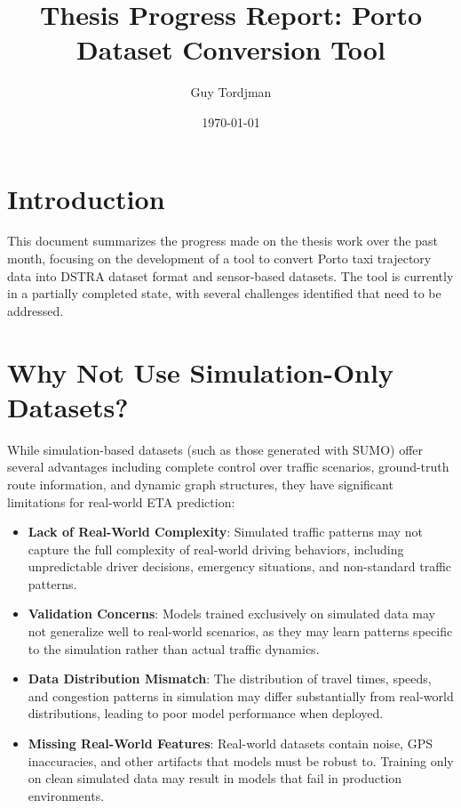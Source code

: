 \documentclass[11pt,a4paper]{article}
\title{Thesis Progress Report: Porto Dataset Conversion Tool}
\author{Guy Tordjman}
\date{\today}
\begin{document}
\maketitle

\tableofcontents
\newpage

\section{Introduction}

This document summarizes the progress made on the thesis work over the past month, focusing on the development of a tool to convert Porto taxi trajectory data into DSTRA dataset format and sensor-based datasets. The tool is currently in a partially completed state, with several challenges identified that need to be addressed.

\section{Why Not Use Simulation-Only Datasets?}

While simulation-based datasets (such as those generated with SUMO) offer several advantages including complete control over traffic scenarios, ground-truth route information, and dynamic graph structures, they have significant limitations for real-world ETA prediction:

\begin{itemize}
    \item \textbf{Lack of Real-World Complexity}: Simulated traffic patterns may not capture the full complexity of real-world driving behaviors, including unpredictable driver decisions, emergency situations, and non-standard traffic patterns.
    \item \textbf{Validation Concerns}: Models trained exclusively on simulated data may not generalize well to real-world scenarios, as they may learn patterns specific to the simulation rather than actual traffic dynamics.
    \item \textbf{Data Distribution Mismatch}: The distribution of travel times, speeds, and congestion patterns in simulation may differ substantially from real-world distributions, leading to poor model performance when deployed.
    \item \textbf{Missing Real-World Features}: Real-world datasets contain noise, GPS inaccuracies, and other artifacts that models must be robust to. Training only on clean simulated data may result in models that fail in production environments.
\end{itemize}
\end{document}
